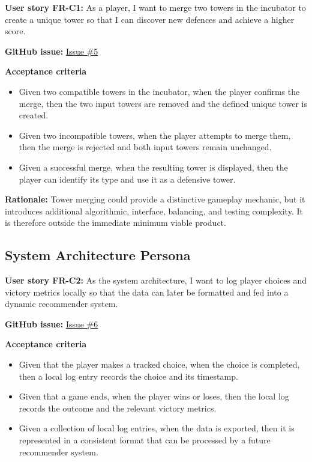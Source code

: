 \documentclass[12pt,a4paper]{article}
\begin{document}
\textbf{User story FR-C1:} As a player, I want to merge two towers in the incubator
to create a unique tower so that I can discover new defences and achieve a
higher score.

\textbf{GitHub issue:} \href{https://github.com/nexuma/tower-defence-final-project/issues/5}{Issue \#5}

\par\medskip
\noindent\textbf{Acceptance criteria}
\par\smallskip
\begin{itemize}[leftmargin=1.5em,itemsep=0.35em,topsep=0.2em]
    \item Given two compatible towers in the incubator, when the player
    confirms the merge, then the two input towers are removed and the defined
    unique tower is created.
    \item Given two incompatible towers, when the player attempts to merge
    them, then the merge is rejected and both input towers remain unchanged.
    \item Given a successful merge, when the resulting tower is displayed,
    then the player can identify its type and use it as a defensive tower.
\end{itemize}

\par\medskip
\textbf{Rationale:} Tower merging could provide a distinctive gameplay
mechanic, but it introduces additional algorithmic, interface, balancing, and
testing complexity. It is therefore outside the immediate minimum viable
product.

\subsection{System Architecture Persona}

\textbf{User story FR-C2:} As the system architecture, I want to log player choices
and victory metrics locally so that the data can later be formatted and fed
into a dynamic recommender system.

\textbf{GitHub issue:} \href{https://github.com/nexuma/tower-defence-final-project/issues/6}{Issue \#6}

\par\medskip
\noindent\textbf{Acceptance criteria}
\par\smallskip
\begin{itemize}[leftmargin=1.5em,itemsep=0.35em,topsep=0.2em]
    \item Given that the player makes a tracked choice, when the choice is
    completed, then a local log entry records the choice and its timestamp.
    \item Given that a game ends, when the player wins or loses, then the local
    log records the outcome and the relevant victory metrics.
    \item Given a collection of local log entries, when the data is exported,
    then it is represented in a consistent format that can be processed by a
    future recommender system.
\end{itemize}
\end{document}
